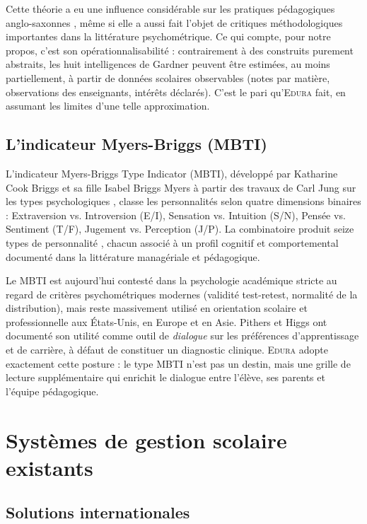 \documentclass[12pt,a4paper,oneside]{report}
\newcommand{\edura}{\textsc{Edura}}
\begin{document}
Cette théorie a eu une influence considérable sur les pratiques pédagogiques anglo-saxonnes \autocite{armstrong2009multiple}, même si elle a aussi fait l'objet de critiques méthodologiques importantes dans la littérature psychométrique. Ce qui compte, pour notre propos, c'est son opérationnalisabilité : contrairement à des construits purement abstraits, les huit intelligences de Gardner peuvent être estimées, au moins partiellement, à partir de données scolaires observables (notes par matière, observations des enseignants, intérêts déclarés). C'est le pari qu'\edura{} fait, en assumant les limites d'une telle approximation.

\subsection{L'indicateur Myers-Briggs (MBTI)}

L'indicateur Myers-Briggs Type Indicator (\ac{MBTI}), développé par Katharine Cook Briggs et sa fille Isabel Briggs Myers à partir des travaux de Carl Jung sur les types psychologiques \autocite{jung1921psychological}, classe les personnalités selon quatre dimensions binaires : Extraversion vs. Introversion (E/I), Sensation vs. Intuition (S/N), Pensée vs. Sentiment (T/F), Jugement vs. Perception (J/P). La combinatoire produit seize types de personnalité \autocite{myers1980gifts}, chacun associé à un profil cognitif et comportemental documenté dans la littérature managériale et pédagogique.

Le MBTI est aujourd'hui contesté dans la psychologie académique stricte au regard de critères psychométriques modernes (validité test-retest, normalité de la distribution), mais reste massivement utilisé en orientation scolaire et professionnelle aux États-Unis, en Europe et en Asie. Pithers \autocite{pithers2002cognitive} et Higgs \autocite{higgs2001does} ont documenté son utilité comme outil de \textit{dialogue} sur les préférences d'apprentissage et de carrière, à défaut de constituer un diagnostic clinique. \edura{} adopte exactement cette posture : le type MBTI n'est pas un destin, mais une grille de lecture supplémentaire qui enrichit le dialogue entre l'élève, ses parents et l'équipe pédagogique.

\section{Systèmes de gestion scolaire existants}

\subsection{Solutions internationales}
\end{document}
